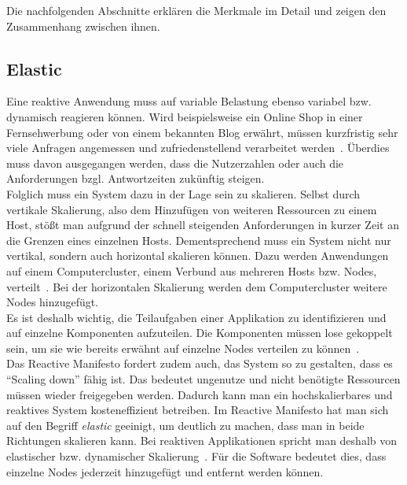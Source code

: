 Die nachfolgenden Abschnitte erklären die Merkmale im Detail und zeigen den Zusammenhang zwischen ihnen.

\pagebreak

\subsection{Elastic}\label{subsec:elastic}
Eine reaktive Anwendung muss auf variable Belastung ebenso variabel bzw. dynamisch reagieren können. Wird beispielsweise ein Online Shop in einer Fernsehwerbung oder von einem bekannten Blog erwährt, müssen kurzfristig sehr viele Anfragen angemessen und zufriedenstellend verarbeitet werden~\cite[S.~39]{kuhn_reactive_2015}. Überdies muss davon ausgegangen werden, dass die Nutzerzahlen oder auch die Anforderungen bzgl. Antwortzeiten zukünftig steigen.\\
Folglich muss ein System dazu in der Lage sein zu skalieren. Selbst durch vertikale Skalierung, also dem Hinzufügen von weiteren Ressourcen zu einem Host, stößt man aufgrund der schnell steigenden Anforderungen in kurzer Zeit an die Grenzen eines einzelnen Hosts. Dementsprechend muss ein System nicht nur vertikal, sondern auch horizontal skalieren können. Dazu werden Anwendungen auf einem Computercluster, einem Verbund aus mehreren Hosts bzw. Nodes, verteilt~\cite[S.~7]{vernon_reactive_2016}. Bei der horizontalen Skalierung werden dem Computercluster weitere Nodes hinzugefügt.\\
Es ist deshalb wichtig, die Teilaufgaben einer Applikation zu identifizieren und auf einzelne Komponenten aufzuteilen. Die Komponenten müssen lose gekoppelt sein, um sie wie bereits erwähnt auf einzelne Nodes verteilen zu können~\cite[S.~40]{kuhn_reactive_2015}.\\

Das Reactive Manifesto fordert zudem auch, das System so zu gestalten, dass es \enquote{Scaling down} fähig ist. Das bedeutet ungenutze und nicht benötigte Ressourcen müssen wieder freigegeben werden. Dadurch kann man ein hochskalierbares und reaktives System kosteneffizient betreiben. Im Reactive Manifesto hat man sich auf den Begriff \textit{elastic} geeinigt, um deutlich zu machen, dass man in beide Richtungen skalieren kann. Bei reaktiven Applikationen spricht man deshalb von elastischer bzw. dynamischer Skalierung~\cite[S.~8]{vernon_reactive_2016}. Für die Software bedeutet dies, dass einzelne Nodes jederzeit hinzugefügt und entfernt werden können.\\

